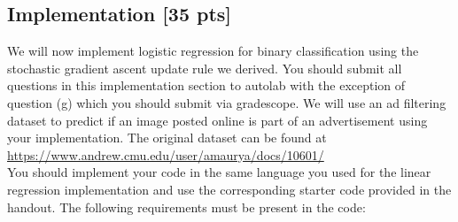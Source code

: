 \documentclass[a4paper]{article}
\theoremstyle{definition}
\begin{document}
\subsection{Implementation [35 pts]}

We will now implement logistic regression for binary classification using the stochastic gradient ascent update rule we derived. You should submit all questions in this implementation section to autolab with the exception of question (g) which you should submit via gradescope. We will use an ad filtering dataset to predict if an image posted online is part of an advertisement using your implementation. The original dataset can be found at \url{https://www.andrew.cmu.edu/user/amaurya/docs/10601/}\\

You should implement your code in the same language you used for the linear regression implementation and use the corresponding starter code provided in the handout. The following requirements must be present in the code:
\end{document}
